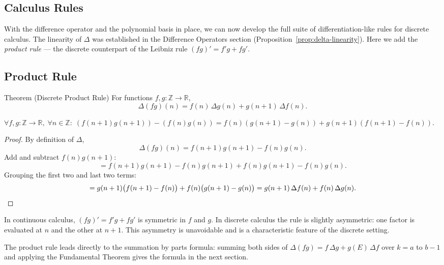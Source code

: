 
\subsection{Calculus Rules}
\label{sec:calculus-rules}

With the difference operator and the polynomial basis in place, we can
now develop the full suite of differentiation-like rules for discrete
calculus. The linearity of \(\Delta\) was established in the Difference
Operators section (Proposition~\ref{prop:delta-linearity}). Here we add
the \emph{product rule} --- the discrete counterpart of the Leibniz rule
\((fg)' = f'g + fg'\).

\subsection*{Product Rule}

\begin{theorembox}{Theorem (Discrete Product Rule)}
For functions \(f, g : \mathbb{Z} \to \mathbb{R}\),
\[
\Delta(fg)(n)
=
f(n)\,\Delta g(n) + g(n+1)\,\Delta f(n).
\]
\end{theorembox}
\label{thm:product-rule}

\begin{remark*}
\(\forall f,g : \mathbb{Z}\to\mathbb{R},\; \forall n \in \mathbb{Z}:\;
(f(n+1)g(n+1)) - (f(n)g(n))
= f(n)(g(n+1)-g(n)) + g(n+1)(f(n+1)-f(n))\).
\end{remark*}

\begin{proof}
By definition of \(\Delta\),
\[
\Delta(fg)(n) = f(n+1)g(n+1) - f(n)g(n).
\]
Add and subtract \(f(n)g(n+1)\):
\[
= f(n+1)g(n+1) - f(n)g(n+1) + f(n)g(n+1) - f(n)g(n).
\]
Grouping the first two and last two terms:
\[
= g(n+1)\bigl(f(n+1)-f(n)\bigr) + f(n)\bigl(g(n+1)-g(n)\bigr)
= g(n+1)\,\Delta f(n) + f(n)\,\Delta g(n). \qedhere
\]
\end{proof}

\begin{remark*}
In continuous calculus, \((fg)' = f'g + fg'\) is symmetric in \(f\)
and \(g\). In discrete calculus the rule is slightly asymmetric: one
factor is evaluated at \(n\) and the other at \(n+1\). This asymmetry
is unavoidable and is a characteristic feature of the discrete setting.
\end{remark*}

\begin{remark*}
The product rule leads directly to the summation by parts formula:
summing both sides of \(\Delta(fg) = f\,\Delta g + g(E)\,\Delta f\)
over \(k = a\) to \(b-1\) and applying the Fundamental Theorem gives
the formula in the next section.
\end{remark*}
